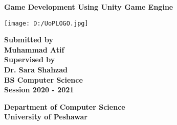 
	\begin{center}
		
		
		
		{\Large \textbf{Game Development Using Unity Game Engine}} 
		\vspace{2cm}
		
		
		
		{\texttt{[image: D:/UoPLOGO.jpg]}} 
		
		\vspace{2cm}
		
		{\large \textbf {Submitted by}} \\
		\vspace{0.1cm}
		{\textbf{Muhammad Atif}  }\\
		
		\vspace{2cm}
		{\large\textbf{Supervised by}} \\
		\vspace{0.1cm}
		\textbf{Dr. Sara Shahzad}  \\
		
		\vspace{2cm}
		{\textbf{BS Computer Science}} \\
		\vspace{0.1cm}
		{\textbf{Session 2020 - 2021}}
		
		\vspace{2cm}
		
		{\textbf{Department of Computer Science}}\\
		\vspace{0.1cm}
		{\textbf{University of Peshawar}} 
\thispagestyle{empty}  
	\end{center}
	


